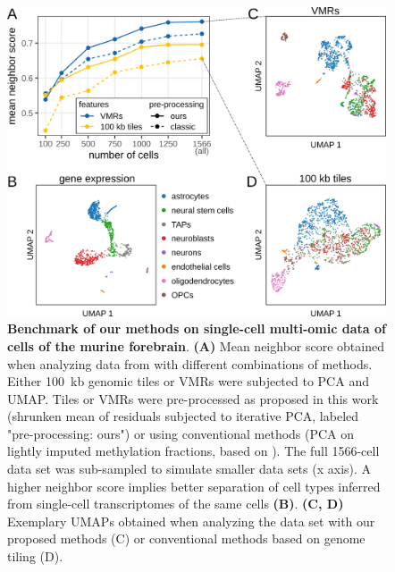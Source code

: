 \documentclass[twocolumn,10pt]{article}
\begin{document}
\begin{figure}
    \begin{center}
        \includegraphics[width=\columnwidth]{figures/Fig_benchmark.png}
    \end{center}
    \caption{\small \textbf{Benchmark of our methods on single-cell multi-omic data of cells of the murine forebrain}.
    \textbf{(A)} Mean neighbor score obtained when analyzing data from \citet{kremer_scnmt} with different combinations of methods.
    Either 100~kb genomic tiles or VMRs were subjected to PCA and UMAP.
    Tiles or VMRs were pre-processed as proposed in this work (shrunken mean of residuals subjected to iterative PCA, labeled "pre-processing: ours") or using conventional methods (PCA on lightly imputed methylation fractions, based on \citep{luo2017single}).
    The full 1566-cell data set was sub-sampled to simulate smaller data sets (x axis).
    A higher neighbor score implies better separation of cell types inferred from single-cell transcriptomes of the same cells \textbf{(B)}.
    \textbf{(C, D)} Exemplary UMAPs obtained when analyzing the data set with our proposed methods (C) or conventional methods based on genome tiling (D).}
    \label{fig:score}
\end{figure}
\end{document}
